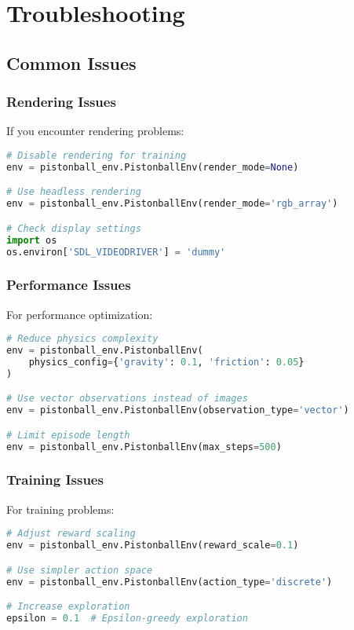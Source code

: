 \section{Troubleshooting}

\subsection{Common Issues}

\subsubsection{Rendering Issues}

If you encounter rendering problems:

\begin{lstlisting}[language=python, caption=Rendering Troubleshooting]
# Disable rendering for training
env = pistonball_env.PistonballEnv(render_mode=None)

# Use headless rendering
env = pistonball_env.PistonballEnv(render_mode='rgb_array')

# Check display settings
import os
os.environ['SDL_VIDEODRIVER'] = 'dummy'
\end{lstlisting}

\subsubsection{Performance Issues}

For performance optimization:

\begin{lstlisting}[language=python, caption=Performance Optimization]
# Reduce physics complexity
env = pistonball_env.PistonballEnv(
    physics_config={'gravity': 0.1, 'friction': 0.05}
)

# Use vector observations instead of images
env = pistonball_env.PistonballEnv(observation_type='vector')

# Limit episode length
env = pistonball_env.PistonballEnv(max_steps=500)
\end{lstlisting}

\subsubsection{Training Issues}

For training problems:

\begin{lstlisting}[language=python, caption=Training Troubleshooting]
# Adjust reward scaling
env = pistonball_env.PistonballEnv(reward_scale=0.1)

# Use simpler action space
env = pistonball_env.PistonballEnv(action_type='discrete')

# Increase exploration
epsilon = 0.1  # Epsilon-greedy exploration
\end{lstlisting}

